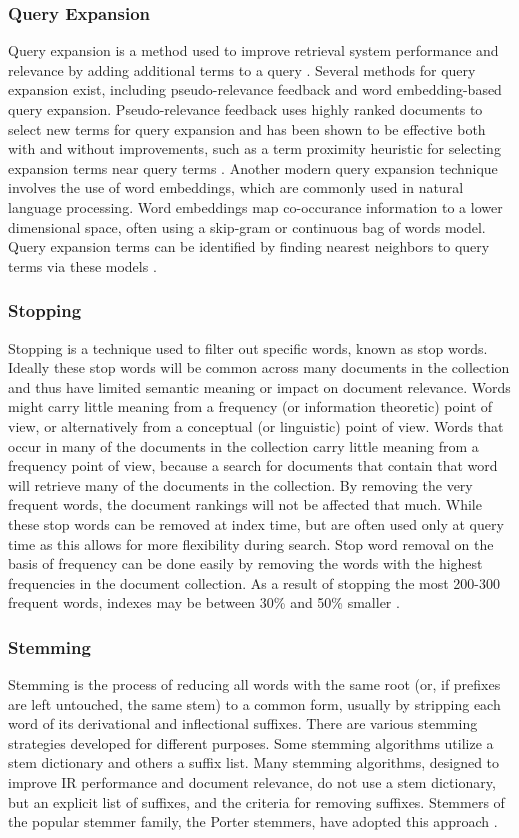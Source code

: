 \documentclass[conference]{IEEEtran}
\begin{document}
\subsubsection{Query Expansion}
Query expansion is a method used to improve retrieval system performance and relevance by adding additional terms to a query \cite{efthimiadis1996query}. Several methods for query expansion exist, including pseudo-relevance feedback and word embedding-based query expansion. Pseudo-relevance feedback uses highly ranked documents to select new terms for query expansion and has been shown to be effective both with and without improvements, such as a term proximity heuristic for selecting expansion terms near query terms \cite{lv2010positional}. Another modern query expansion technique involves the use of word embeddings, which are commonly used in natural language processing. Word embeddings map co-occurance information to a lower dimensional space, often using a skip-gram or continuous bag of words model. Query expansion terms can be identified by finding nearest neighbors to query terms via these models \cite{diaz2016query}.
\subsubsection{Stopping}
Stopping is a technique used to filter out specific words, known as stop words. Ideally these stop words will be common across many documents in the collection and thus have limited semantic meaning or impact on document relevance. Words might carry little meaning from a frequency (or information theoretic) point of view, or alternatively from a conceptual (or linguistic) point of view. Words that occur in many of the documents in the collection carry little meaning from a frequency point of view, because a search for documents that contain that word will retrieve many of the documents in the collection. By removing the very frequent words, the document rankings will not be affected that much. While these stop words can be removed at index time, but are often used only at query time as this allows for more flexibility during search. Stop word removal on the basis of frequency can be done easily by removing the words with the highest
frequencies in the document collection. As a result of stopping the most 200-300 frequent words, indexes may be between 30\% and 50\% smaller \cite{djoerd2001statistical}.
\subsubsection{Stemming}
Stemming is the process of reducing all words with the same root (or, if prefixes are left untouched, the same stem) to a common form, usually by stripping each word of its derivational
and inflectional suffixes. There are various stemming strategies developed for different purposes\cite{Lovins1968DevelopmentOA}. Some stemming algorithms utilize a stem dictionary and others a suffix list. Many stemming algorithms, designed to improve IR performance and document relevance, do not use
a stem dictionary, but an explicit list of suffixes, and the criteria for removing suffixes. Stemmers of the popular stemmer family, the Porter stemmers, have adopted this approach \cite{airio2006word}.
\\\\
\end{document}
